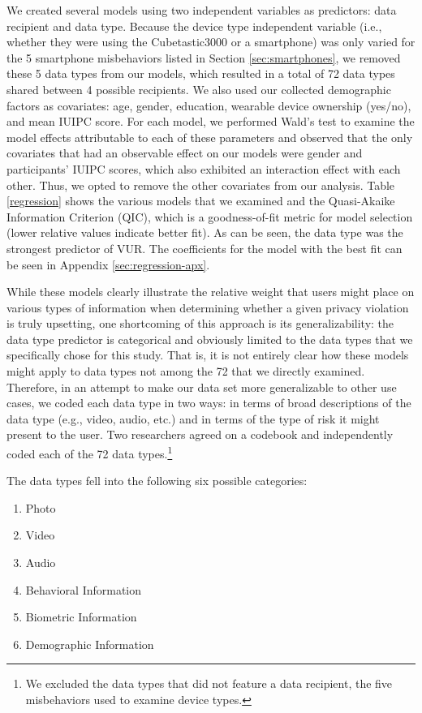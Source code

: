 We created several models using two independent variables as predictors: data recipient and data type. Because the device type independent variable (i.e., whether they were using the Cubetastic3000 or a smartphone) was only varied for the 5 smartphone misbehaviors listed in Section \ref{sec:smartphones}, we removed these 5 data types from our models, which resulted in a total of 72 data types shared between 4 possible recipients. We also used our collected demographic factors as covariates: age, gender, education, wearable device ownership (yes/no), and mean IUIPC score. For each model, we performed Wald's test to examine the model effects attributable to each of these parameters and observed that the only covariates that had an observable effect on our models were gender and participants' IUIPC scores, which also exhibited an interaction effect with each other. Thus, we opted to remove the other covariates from our analysis. Table \ref{regression} shows the various models that we examined and the Quasi-Akaike Information Criterion (QIC), which is a goodness-of-fit metric for model selection (lower relative values indicate better fit). As can be seen, the data type was the strongest predictor of VUR. The coefficients for the model with the best fit can be seen in Appendix \ref{sec:regression-apx}.

While these models clearly illustrate  the relative weight that users might place on various types of information when determining whether a given privacy violation is truly upsetting, one shortcoming of this approach is its generalizability: the data type predictor is categorical and obviously limited to the data types that we specifically chose for this study. That is, it is not entirely clear how these models might apply to data types not among the 72 that we directly examined. Therefore, in an attempt to make our data set more generalizable to other use cases, we coded each data type in two ways: in terms of broad descriptions of the data type (e.g., video, audio, etc.) and in terms of the type of risk it might present to the user. Two researchers agreed on a codebook and independently coded each of the 72 data types.\footnote{We excluded the data types that did not feature a data recipient, the five misbehaviors used to examine device types.}

The data types fell into the following six possible categories:
\begin{enumerate}[topsep=0pt,itemsep=-1ex,partopsep=1ex,parsep=1ex]
\item Photo
\item Video
\item Audio
\item Behavioral Information
\item Biometric Information
\item Demographic Information
\end{enumerate}

